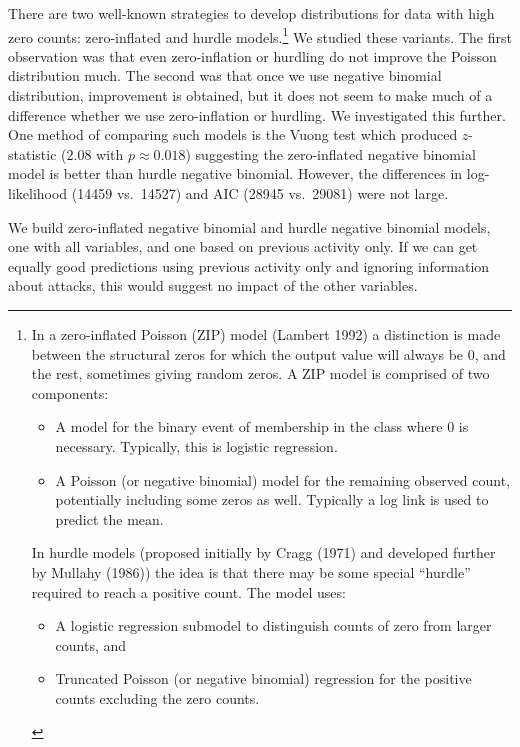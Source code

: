\documentclass[a4paper,fleqn]{cas-dc}
\begin{document}
There are two well-known strategies to develop distributions for data
with high zero counts: zero-inflated and hurdle
models.\footnote{In a zero-inflated Poisson (ZIP) model (Lambert 1992) a distinction is made between   the structural zeros for which the output value  will always be 0, and the rest, sometimes giving random zeros. A  ZIP model is comprised of two components:

\begin{itemize}
\item  A model for the binary event of membership in the class where 0 is necessary. Typically, this is logistic regression. 

\item  A Poisson (or negative binomial) model for the remaining observed count, potentially including some zeros as well. Typically a log link is used to predict the mean.
\end{itemize}


In hurdle models (proposed initially by Cragg (1971) and developed further by Mullahy (1986)) the idea  is that there may be some special  “hurdle” required to reach a positive count. The model  uses:

\begin{itemize}
\item A logistic regression  submodel to distinguish counts of zero from larger counts, and
\item  Truncated Poisson (or negative binomial) regression for the positive counts  excluding the zero counts.
\end{itemize}} We studied these variants. The first observation was that
even zero-inflation or hurdling do not improve the Poisson distribution
much. The second was that once we use negative binomial distribution,
improvement is obtained, but it does not seem to make much of a
difference whether we use zero-inflation or hurdling. We investigated
this further. One method of comparing such models is the Vuong test
which produced \(z\)-statistic (\(2.08\) with \(p\approx 0.018\))
suggesting the zero-inflated negative binomial model is better than
hurdle negative binomial. However, the differences in log-likelihood
(14459 vs.~14527) and AIC (28945 vs.~29081) were not large.










We build zero-inflated negative binomial and hurdle negative binomial
models, one with all variables, and one based on previous activity only.
If we can get equally good predictions using previous activity only and
ignoring information about attacks, this would suggest no impact of the
other variables.
\end{document}
